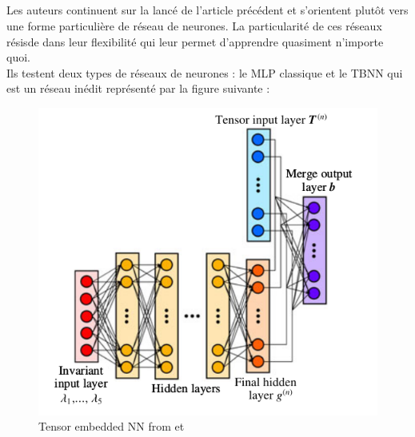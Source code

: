 \documentclass[a4paper,12pt]{report}
\numberwithin{equation}{section} %
\begin{document}
\newpage

\subsection*{\cite{ling2016reynolds}}
\noindent Les auteurs continuent sur la lancé de l'article précédent et s'orientent plutôt vers une forme particulière de réseau de neurones. La particularité de ces réseaux résisde dans leur flexibilité qui leur permet d'apprendre quasiment n'importe quoi.\\
Ils testent deux types de réseaux de neurones : le MLP classique et le TBNN qui est un réseau inédit représenté par la figure suivante :

\begin{figure}[!ht]
\centering
\includegraphics[scale=0.5]{TBNN.png}
\caption{Tensor embedded NN from \citep{kutz2017deep} et \citep{ling2016reynolds}}
\label{TBNN}
\end{figure}
 
\end{document}
